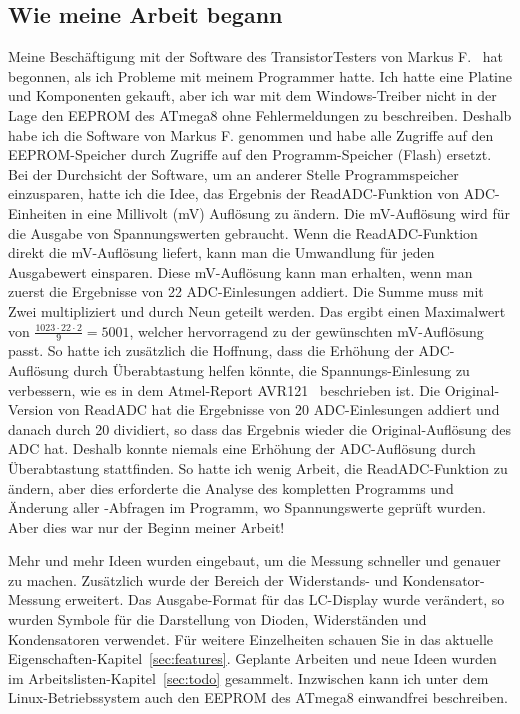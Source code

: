 \subsection*{Wie meine Arbeit begann}
Meine Beschäftigung mit der Software des TransistorTesters von Markus F.~\cite{Frejek} hat begonnen, als ich Probleme mit
meinem Programmer hatte.
Ich hatte eine Platine und Komponenten gekauft, aber ich war mit dem Windows-Treiber nicht in der Lage den EEPROM des ATmega8
ohne Fehlermeldungen zu beschreiben.
Deshalb habe ich die Software von Markus F. genommen und habe alle Zugriffe auf den EEPROM-Speicher durch
Zugriffe auf den Programm-Speicher (Flash) ersetzt.
Bei der Durchsicht der Software, um an anderer Stelle Programmspeicher einzusparen, hatte ich die Idee,
das Ergebnis der ReadADC-Funktion von ADC-Einheiten in eine Millivolt (mV) Auflösung zu ändern.
Die mV-Auflösung wird für die Ausgabe von Spannungswerten gebraucht.
Wenn die ReadADC-Funktion direkt die mV-Auflösung liefert, kann man die Umwandlung für jeden Ausgabewert einsparen.
Diese mV-Auflösung kann man erhalten, wenn man zuerst die Ergebnisse von 22 ADC-Einlesungen addiert.
Die Summe muss mit Zwei multipliziert und durch Neun geteilt werden.
Das ergibt einen Maximalwert von \begin{math}\frac{1023\cdot22\cdot2}{9} = 5001\end{math},
welcher hervorragend zu der gewünschten mV-Auflösung passt.
So hatte ich zusätzlich die Hoffnung, dass die Erhöhung der ADC-Auflösung durch Überabtastung helfen
könnte, die Spannungs-Einlesung zu verbessern, wie es in dem Atmel-Report AVR121~\cite{AVR121} beschrieben ist.
Die Original-Version von ReadADC hat die Ergebnisse von 20 ADC-Einlesungen addiert und danach durch 20 dividiert,
so dass das Ergebnis wieder die Original-Auflösung des ADC hat. Deshalb konnte niemals eine Erhöhung der ADC-Auflösung
durch Überabtastung stattfinden.
So hatte ich wenig Arbeit, die ReadADC-Funktion zu ändern, aber dies erforderte die Analyse des kompletten
Programms und Änderung aller -Abfragen im Programm, wo Spannungswerte geprüft wurden.
Aber dies war nur der Beginn meiner Arbeit!

Mehr und mehr Ideen wurden eingebaut, um die Messung schneller und genauer zu machen.
Zusätzlich wurde der Bereich der Widerstands- und Kondensator-Messung erweitert.
Das Ausgabe-Format für das LC-Display wurde verändert, so wurden Symbole für die Darstellung von
Dioden, Widerständen und Kondensatoren verwendet.
Für weitere Einzelheiten schauen Sie in das aktuelle Eigenschaften-Kapitel~\ref{sec:features}.
Geplante Arbeiten und neue Ideen wurden im Arbeitslisten-Kapitel~\ref{sec:todo} gesammelt.
Inzwischen kann ich unter dem Linux-Betriebssystem auch den EEPROM des ATmega8 einwandfrei beschreiben.

